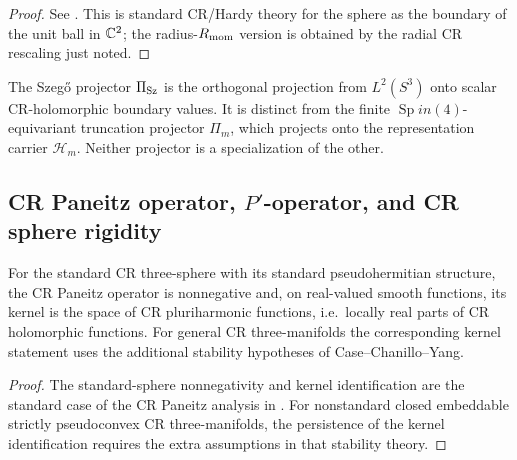 \documentclass[11pt]{article}
\begin{document}
\begin{proof}
See \cite{Folland1972,FollandStein1982}. This is standard CR/Hardy theory for the
sphere as the boundary of the unit ball in \(\mathbb{C}^2\); the radius-\(R_{\mathrm{mom}}\) version is obtained by the radial CR rescaling just noted.
\end{proof}


\begin{remark}
\label{p1:rem:szego-not-finite-carrier}
The Szeg\H{o} projector \(\Pi_{\rm Sz}\) is the orthogonal projection from
\(L^2(S^3)\) onto scalar CR-holomorphic boundary values.  It is distinct from
the finite \(\operatorname{Sp}in(4)\)-equivariant truncation projector \(\Pi_m\), which projects
onto the representation carrier \(\mathcal H_m\).  Neither projector is a
specialization of the other.
\end{remark}

\subsection{CR Paneitz operator, \texorpdfstring{$P'$}{P'}-operator, and CR sphere rigidity}
\label{p1:subsec:cr-paneitz}

\begin{theorem}
\label{p1a:theorem:atlas-paneitz-positivity-on-the-standard-cr-three-sp-8fa6a91}

For the standard CR three-sphere with its standard pseudohermitian structure, the
CR Paneitz operator is nonnegative and, on real-valued smooth functions, its kernel is the space of CR pluriharmonic
functions, i.e.\ locally real parts of CR holomorphic functions.  For general CR three-manifolds the corresponding kernel statement uses the additional stability hypotheses of Case--Chanillo--Yang.
\end{theorem}

\begin{proof}
The standard-sphere nonnegativity and kernel identification are the standard case
of the CR Paneitz analysis in \cite{caseChanilloYang2016CRPaneitz}.  For nonstandard closed embeddable strictly pseudoconvex CR three-manifolds, the persistence of the kernel
identification requires the extra assumptions in that stability theory.
\end{proof}
\end{document}
